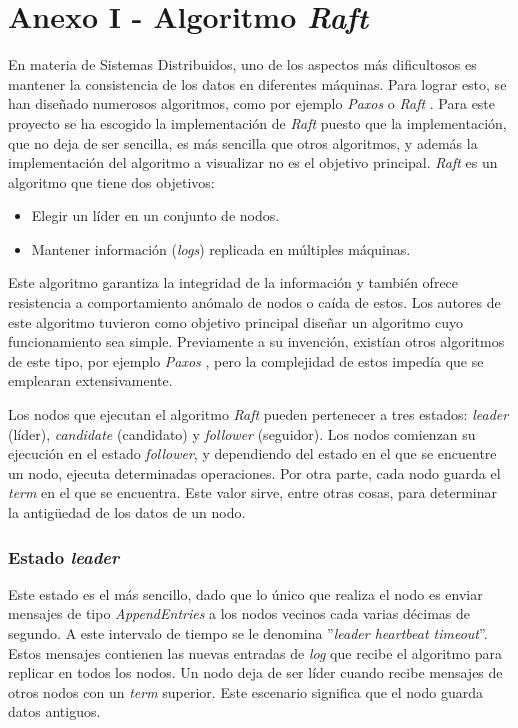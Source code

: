 \chapter*{Anexo I - Algoritmo \textit{Raft}}

En materia de Sistemas Distribuidos, uno de los aspectos más dificultosos es mantener la consistencia de los datos en diferentes máquinas. Para lograr esto, se han diseñado numerosos algoritmos, como por ejemplo \textit{Paxos} \cite{paxos} o \textit{Raft} \cite{raft1}. Para este proyecto se ha escogido la implementación de \textit{Raft} puesto que la implementación, que no deja de ser sencilla, es más sencilla que otros algoritmos, y además la implementación del algoritmo a visualizar no es el objetivo principal. \textit{Raft} es un algoritmo que tiene dos objetivos:

\begin{itemize}
\item Elegir un líder en un conjunto de nodos.
\item Mantener información (\textit{logs}) replicada en múltiples máquinas.
\end{itemize}

Este algoritmo garantiza la integridad de la información y también ofrece resistencia a comportamiento anómalo de nodos o caída de estos. Los autores de este algoritmo tuvieron como objetivo principal diseñar un algoritmo cuyo funcionamiento sea simple. Previamente a su invención, existían otros algoritmos de este tipo, por ejemplo \textit{Paxos} \cite{paxos}, pero la complejidad de estos impedía que se emplearan extensivamente.

Los nodos que ejecutan el algoritmo \textit{Raft} pueden pertenecer a tres estados: \textit{leader} (líder), \textit{candidate} (candidato) y \textit{follower} (seguidor). Los nodos comienzan su ejecución en el estado \textit{follower}, y dependiendo del estado en el que se encuentre un nodo, ejecuta determinadas operaciones. Por otra parte, cada nodo guarda el \textit{term} en el que se encuentra. Este valor sirve, entre otras cosas, para determinar la antigüedad de los datos de un nodo.

\subsection*{Estado \textit{leader}}

Este estado es el más sencillo, dado que lo único que realiza el nodo es enviar mensajes de tipo \textit{AppendEntries} a los nodos vecinos cada varias décimas de segundo. A este intervalo de tiempo se le denomina ''\textit{leader heartbeat timeout}''. Estos mensajes contienen las nuevas entradas de \textit{log} que recibe el algoritmo para replicar en todos los nodos. Un nodo deja de ser líder cuando recibe mensajes de otros nodos con un \textit{term} superior. Este escenario significa que el nodo guarda datos antiguos.

